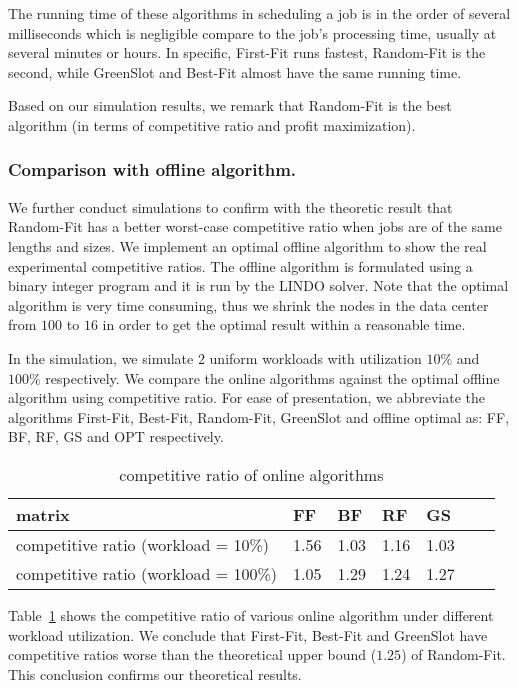 \documentclass[conference]{IEEEtran}
\begin{document}
The running time of these algorithms in scheduling a job is in the order of several milliseconds which is negligible compare to the job's processing time, usually at several minutes or hours. In specific, First-Fit runs fastest, Random-Fit is the second, while GreenSlot and Best-Fit almost have the same running time.

Based on our simulation results, we remark that Random-Fit is the best algorithm (in terms of competitive ratio and profit maximization).

\subsubsection{Comparison with offline algorithm.}

We further conduct simulations to confirm with the theoretic result that Random-Fit has a better worst-case competitive ratio when jobs are of the same lengths and sizes. We implement an optimal offline algorithm to show the real experimental competitive ratios. The offline algorithm is formulated using a binary integer program and it is run by the LINDO solver. Note that the optimal algorithm is very time consuming, thus we shrink the nodes in the data center from $100$ to $16$ in order to get the optimal result within a reasonable time.

In the simulation, we simulate $2$ uniform workloads with utilization $10\%$ and $100\%$ respectively. We compare the online algorithms against the optimal offline algorithm using competitive ratio. For ease of presentation, we abbreviate the algorithms First-Fit, Best-Fit, Random-Fit, GreenSlot and offline optimal as: FF, BF, RF, GS and OPT respectively.



\begin{table}[!ht]
\centering
\caption{competitive ratio of online algorithms}
\begin{tabular}{|l|l|l|l|l|l|l|}  \hline
matrix & FF & BF & RF & GS \\ \hline \hline
competitive ratio (workload = 10\%) &1.56&	1.03&	1.16&	1.03\\ \hline
competitive ratio (workload = 100\%)      &   1.05 &   1.29   & 1.24 &   1.27   \\ \hline
\end{tabular}
\label{tb_com_opt_20}
\end{table}



Table~\ref{tb_com_opt_20} shows the competitive ratio of various online algorithm under different workload utilization. We conclude that First-Fit, Best-Fit and GreenSlot have competitive ratios worse than the theoretical upper bound ($1.25$) of Random-Fit. This conclusion confirms our theoretical results.
\end{document}
